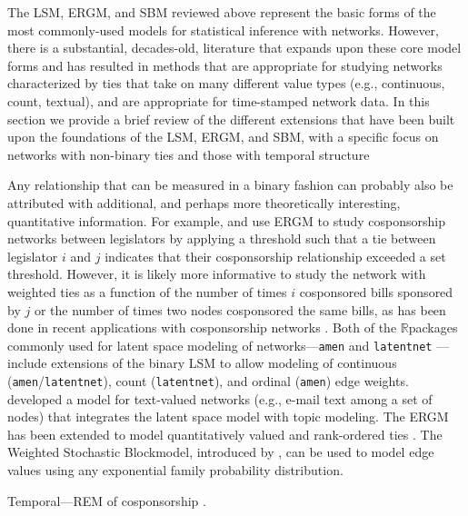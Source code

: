 \documentclass[fleqn,12pt]{wlscirep}
\newcommand{\R}{$\mathbb{R}$}
\begin{document}
The LSM, ERGM, and SBM reviewed above represent the basic forms of the most commonly-used models for statistical inference with networks. However, there is a substantial, decades-old, literature that expands upon these core model forms and has resulted in methods that are appropriate for studying networks characterized by ties that take on many different value types (e.g., continuous, count, textual), and are appropriate for time-stamped network data. In this section we provide a brief review of the different extensions that have been built upon the foundations of the LSM, ERGM, and SBM, with a specific focus on networks with non-binary ties and those with temporal structure

Any relationship that can be measured in a binary fashion can probably also be attributed with additional, and perhaps more theoretically interesting, quantitative information. For example, \citet{cranmer2011inferential} and \citet{baller2017specialists}  use ERGM to study cosponsorship networks between legislators by applying a threshold such that a tie between legislator $i$ and $j$ indicates that their cosponsorship relationship exceeded a set threshold. However, it is likely more informative to study the network with weighted ties as a function of the number of times $i$ cosponsored bills sponsored by $j$ or the number of times two nodes cosponsored the same bills, as has been done in recent applications with cosponsorship networks \citep[e.g., ][]{kirkland2012multimember, signorelli2018penalized}. Both of the \R packages commonly used for latent space modeling of networks---\texttt{amen} \citep{amen} and \texttt{latentnet} \citep{latentnet}---include extensions of the binary LSM to allow modeling of continuous (\texttt{amen}/\texttt{latentnet}), count (\texttt{latentnet}), and ordinal (\texttt{amen}) edge weights. \cite{krafft2012topic} developed a model for text-valued networks (e.g., e-mail text among a set of nodes) that integrates the latent space model with topic modeling. The ERGM has been extended to model quantitatively valued and rank-ordered ties \citep{wyatt2009dynamic, krivitsky2012exponential,desmarais2012statistical, krivitsky2017exponential}. The Weighted Stochastic Blockmodel, introduced by \cite{aicher2014learning}, can be used to model edge values using any exponential family probability distribution.


Temporal---REM of cosponsorship \citep{brandenberger2018trading}. 
\end{document}
